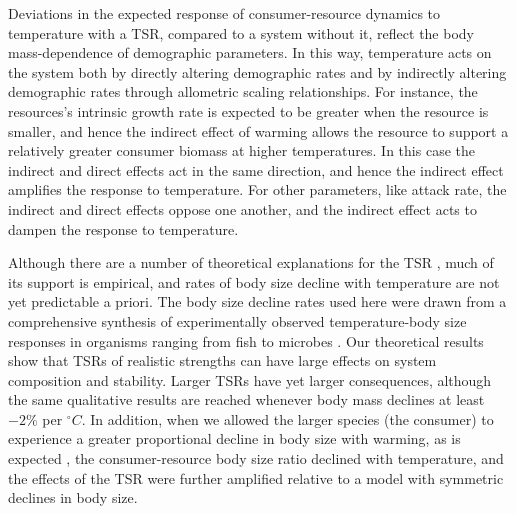 \documentclass[11pt]{article}
\begin{document}
Deviations in the expected response of consumer-resource dynamics to temperature with a TSR, compared to a system without it, reflect the body mass-dependence of demographic parameters. 
In this way, temperature acts on the system both by directly altering demographic rates and by indirectly altering demographic rates through allometric scaling relationships. 
For instance, the resources's intrinsic growth rate is expected to be greater when the resource is smaller, and hence the indirect effect of warming allows the resource to support a relatively greater consumer biomass at higher temperatures. 
In this case the indirect and direct effects act in the same direction, and hence the indirect effect amplifies the response to temperature.
For other parameters, like attack rate, the indirect and direct effects oppose one another, and the indirect effect acts to dampen the response to temperature.

Although there are a number of theoretical explanations for the TSR \citep{Berrigan1994,Perrin1995,VanderHave1996,Angilletta2003,DeLong2012}, much of its support is empirical, and rates of body size decline with temperature are not yet predictable a priori.
The body size decline rates used here were drawn from a comprehensive synthesis of experimentally observed temperature-body size responses in organisms ranging from fish to microbes \citep{Forster2012}. 
Our theoretical results show that TSRs of realistic strengths can have large effects on system composition and stability.
Larger TSRs have yet larger consequences, although the same qualitative results are reached whenever body mass declines at least $-2\%$ per $^\circ C$. 
In addition, when we allowed the larger species (the consumer) to experience a greater proportional decline in body size with warming, as is expected \citep{Forster2012}, the consumer-resource body size ratio declined with temperature, and the effects of the TSR were further amplified relative to a model with symmetric declines in body size.
\end{document}
